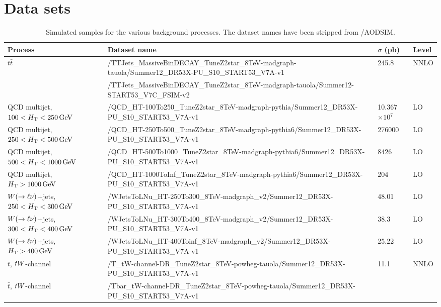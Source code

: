 \chapter{Data sets \label{app:datasets}}


\begin{sidewaystable}
\fontsize{6 pt}{1 em}
\selectfont
\caption{Simulated samples for the various background processes. The dataset names have been
stripped from /AODSIM.}
\begin{center}
\begin{tabular}{l l l l}
\toprule
Process & Dataset name & $\sigma$ (pb) & Level \\
\midrule
\multirow{2}{*}{$t\bar{t}$} &
/TTJets\_MassiveBinDECAY\_TuneZ2star\_8TeV-madgraph-tauola/Summer12\_DR53X-PU\_S10\_START53\_V7A-v1 
& 245.8 & NNLO \\
& /TTJets\_MassiveBinDECAY\_TuneZ2star\_8TeV-madgraph-tauola/Summer12-START53\_V7C\_FSIM-v2 & & \\
\midrule
QCD multijet, $100 < H_{\mathrm{T}}< 250\,\text{Ge\hspace{-.08em}V}$ & 
/QCD\_HT-100To250\_TuneZ2star\_8TeV-madgraph-pythia/Summer12\_DR53X-PU\_S10\_START53\_V7A-v1
& 10.367$\times 10^{7}$ & LO \\
QCD multijet, $250 < H_{\mathrm{T}}< 500\,\text{Ge\hspace{-.08em}V}$ &  
/QCD\_HT-250To500\_TuneZ2star\_8TeV-madgraph-pythia6/Summer12\_DR53X-PU\_S10\_START53\_V7A-v1
& 276000 & LO \\
QCD multijet, $500 < H_{\mathrm{T}}< 1000\,\text{Ge\hspace{-.08em}V}$ & 
/QCD\_HT-500To1000\_TuneZ2star\_8TeV-madgraph-pythia6/Summer12\_DR53X-PU\_S10\_START53\_V7A-v1 
& 8426 & LO \\
QCD multijet, $H_{\mathrm{T}} > 1000\,\text{Ge\hspace{-.08em}V}$ & 
/QCD\_HT-1000ToInf\_TuneZ2star\_8TeV-madgraph-pythia6/Summer12\_DR53X-PU\_S10\_START53\_V7A-v1 
& 204 & LO \\
\midrule
$W(\rightarrow\ell\nu)$+jets, $250 < H_{\mathrm{T}}< 300\,\text{Ge\hspace{-.08em}V}$ & 
/WJetsToLNu\_HT-250To300\_8TeV-madgraph\_v2/Summer12\_DR53X-PU\_S10\_START53\_V7A-v1 & 48.01
& LO \\
$W(\rightarrow\ell\nu)$+jets, $300 < H_{\mathrm{T}}< 400\,\text{Ge\hspace{-.08em}V}$ &
/WJetsToLNu\_HT-300To400\_8TeV-madgraph\_v2/Summer12\_DR53X-PU\_S10\_START53\_V7A-v1 & 38.3 &
LO \\
$W(\rightarrow\ell\nu)$+jets, $H_{\mathrm{T}} > 400\,\text{Ge\hspace{-.08em}V}$ &
/WJetsToLNu\_HT-400Toinf\_8TeV-madgraph\_v2/Summer12\_DR53X-PU\_S10\_START53\_V7A-v1 & 25.22
& LO \\
\midrule
$t$, $tW$-channel &
/T\_tW-channel-DR\_TuneZ2star\_8TeV-powheg-tauola/Summer12\_DR53X-PU\_S10\_START53\_V7A-v1 &
11.1 & NNLO \\
$\bar{t}$, $tW$-channel &
/Tbar\_tW-channel-DR\_TuneZ2star\_8TeV-powheg-tauola/Summer12\_DR53X-PU\_S10\_START53\_V7A-v1

\end{tabular}
\end{center}
\end{sidewaystable}
